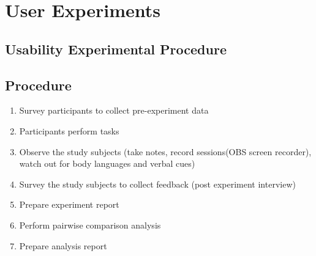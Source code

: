 \documentclass[letterpaper,cleveref]{lipics-v2019}
\theoremstyle{definition}
\begin{document}
\section{User Experiments}
\subsection{Usability Experimental Procedure}

\subsection {Procedure}
\begin {enumerate}

\item Survey participants to collect pre-experiment data
\item Participants perform tasks
\item Observe the study subjects (take notes, record sessions(OBS screen recorder), watch out for body languages and verbal cues)
\item Survey the study subjects to collect feedback (post experiment interview)
\item Prepare experiment report
\item Perform pairwise comparison analysis
\item Prepare analysis report
\end {enumerate}
\end{document}
